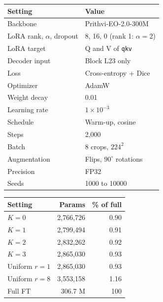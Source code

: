 \documentclass[11pt,a4paper]{report}
\begin{document}
\begin{table}[t]
\centering
\begin{minipage}[t]{0.52\textwidth}
\centering
{}
\label{tab:hyperparams}
\small
\begin{tabular}{@{}ll@{}}
\toprule
\textbf{Setting} & \textbf{Value} \\
\midrule
Backbone & Prithvi-EO-2.0-300M \\
LoRA rank, $\alpha$, dropout & 8, 16, 0 (rank 1: $\alpha = 2$) \\
LoRA target & Q and V of \texttt{qkv} \\
Decoder input & Block L23 only \\
Loss & Cross-entropy + Dice \\
Optimizer & AdamW \\
Weight decay & 0.01 \\
Learning rate & $1 \times 10^{-3}$ \\
Schedule & Warm-up, cosine \\
Steps & 2,000 \\
Batch & 8 crops, $224^2$ \\
Augmentation & Flips, $90^\circ$ rotations \\
Precision & FP32 \\
Seeds & 1000 to 10000 \\
\bottomrule
\end{tabular}
\end{minipage}\hfill
\begin{minipage}[t]{0.45\textwidth}
\centering
{}
\label{tab:params}
\small
\begin{tabular}{@{}lrr@{}}
\toprule
\textbf{Setting} & \textbf{Params} & \textbf{\% of full} \\
\midrule
$K = 0$ & 2,766,726 & 0.90 \\
$K = 1$ & 2,799,494 & 0.91 \\
$K = 2$ & 2,832,262 & 0.92 \\
$K = 3$ & 2,865,030 & 0.93 \\
Uniform $r = 1$ & 2,865,030 & 0.93 \\
Uniform $r = 8$ & 3,553,158 & 1.16 \\
Full FT & 306.7 M & 100 \\
\bottomrule
\end{tabular}
\end{minipage}
\end{table}
\end{document}
